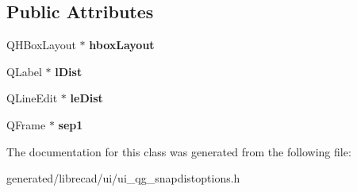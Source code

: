 \subsection*{Public Attributes}
\begin{DoxyCompactItemize}
\item 
\hypertarget{classUi__QG__SnapDistOptions_ae08c6aa159e570a403ed18074ccd1137}{Q\-H\-Box\-Layout $\ast$ {\bfseries hbox\-Layout}}\label{classUi__QG__SnapDistOptions_ae08c6aa159e570a403ed18074ccd1137}

\item 
\hypertarget{classUi__QG__SnapDistOptions_ac95bb82e342b4800b9c32cb4dfe49c71}{Q\-Label $\ast$ {\bfseries l\-Dist}}\label{classUi__QG__SnapDistOptions_ac95bb82e342b4800b9c32cb4dfe49c71}

\item 
\hypertarget{classUi__QG__SnapDistOptions_a061a814b1fec9a41503dc6ce12eedfa5}{Q\-Line\-Edit $\ast$ {\bfseries le\-Dist}}\label{classUi__QG__SnapDistOptions_a061a814b1fec9a41503dc6ce12eedfa5}

\item 
\hypertarget{classUi__QG__SnapDistOptions_ad651160aad05d146768ad937af3e71dd}{Q\-Frame $\ast$ {\bfseries sep1}}\label{classUi__QG__SnapDistOptions_ad651160aad05d146768ad937af3e71dd}

\end{DoxyCompactItemize}


The documentation for this class was generated from the following file\-:\begin{DoxyCompactItemize}
\item 
generated/librecad/ui/ui\-\_\-qg\-\_\-snapdistoptions.\-h\end{DoxyCompactItemize}
